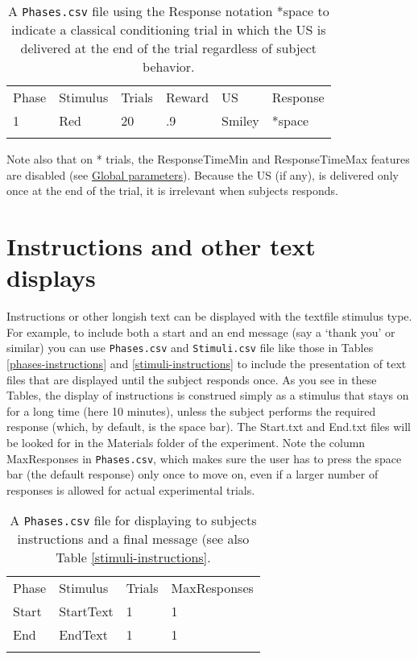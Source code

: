 \documentclass[11pt,]{article}
\renewcommand{\medskip}{}
\begin{document}
\begin{table*}[t]\begin{center}\small\begin{tabular}{@{}llllll@{}}
\hline\noalign{\medskip}
Phase & Stimulus & Trials & Reward & US & Response
\\\noalign{\medskip}
\hline\noalign{\medskip}
1 & Red & 20 & .9 & Smiley & *space
\\\noalign{\medskip}
\hline
\noalign{\medskip}
\end{tabular}\caption{A \texttt{Phases.csv} file using the Response notation *space
to indicate a classical conditioning trial in which the US is delivered
at the end of the trial regardless of subject behavior.
\label{classical}}
\end{center}\end{table*}

Note also that on * trials, the ResponseTimeMin and ResponseTimeMax
features are disabled (see \hyperref[global]{Global parameters}).
Because the US (if any), is delivered only once at the end of the trial,
it is irrelevant when subjects responds.

\section{Instructions and other text displays}

Instructions or other longish text can be displayed with the textfile
stimulus type. For example, to include both a start and an end message
(say a `thank you' or similar) you can use \texttt{Phases.csv} and
\texttt{Stimuli.csv} file like those in Tables \ref{phases-instructions}
and \ref{stimuli-instructions} to include the presentation of text files
that are displayed until the subject responds once. As you see in these
Tables, the display of instructions is construed simply as a stimulus
that stays on for a long time (here 10 minutes), unless the subject
performs the required response (which, by default, is the space bar).
The Start.txt and End.txt files will be looked for in the Materials
folder of the experiment. Note the column MaxResponses in
\texttt{Phases.csv}, which makes sure the user has to press the space
bar (the default response) only once to move on, even if a larger number
of responses is allowed for actual experimental trials.

\begin{table*}[t]\begin{center}\small\begin{tabular}{@{}llll@{}}
\hline\noalign{\medskip}
Phase & Stimulus & Trials & MaxResponses
\\\noalign{\medskip}
\hline\noalign{\medskip}
Start & StartText & 1 & 1
\\\noalign{\medskip}
End & EndText & 1 & 1
\\\noalign{\medskip}
\hline
\noalign{\medskip}
\end{tabular}\caption{A \texttt{Phases.csv} file for displaying to subjects
instructions and a final message (see also Table
\ref{stimuli-instructions}.}
\end{center}\end{table*}
\end{document}
